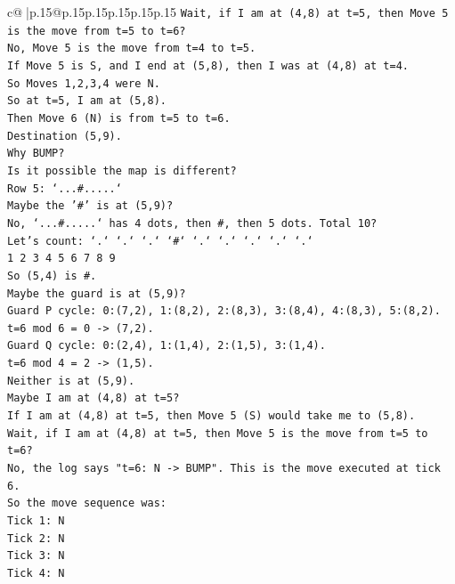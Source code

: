\documentclass{article}
\begin{document}
{\begin{supertabular}{c@{$\;$}|p{.15\linewidth}@{}p{.15\linewidth}p{.15\linewidth}p{.15\linewidth}p{.15\linewidth}p{.15\linewidth}}
{{{\texttt{Wait, if I am at (4,8) at t=5, then Move 5 is the move from t=5 to t=6?} \\
\texttt{No, Move 5 is the move from t=4 to t=5.} \\
\texttt{If Move 5 is S, and I end at (5,8), then I was at (4,8) at t=4.} \\
\texttt{So Moves 1,2,3,4 were N.} \\
\texttt{So at t=5, I am at (5,8).} \\
\texttt{Then Move 6 (N) is from t=5 to t=6.} \\
\texttt{Destination (5,9).} \\
\texttt{Why BUMP?} \\
\texttt{Is it possible the map is different?} \\
\texttt{Row 5: `...\#.....`} \\
\texttt{Maybe the '\#' is at (5,9)?} \\
\texttt{No, `...\#.....` has 4 dots, then \#, then 5 dots. Total 10?} \\
\texttt{Let's count: `.` `.` `.` `\#` `.` `.` `.` `.` `.`} \\
\texttt{1 2 3 4 5 6 7 8 9} \\
\texttt{So (5,4) is \#.} \\
\texttt{Maybe the guard is at (5,9)?} \\
\texttt{Guard P cycle: 0:(7,2), 1:(8,2), 2:(8,3), 3:(8,4), 4:(8,3), 5:(8,2).} \\
\texttt{t=6 mod 6 = 0 {-}> (7,2).} \\
\texttt{Guard Q cycle: 0:(2,4), 1:(1,4), 2:(1,5), 3:(1,4).} \\
\texttt{t=6 mod 4 = 2 {-}> (1,5).} \\
\texttt{Neither is at (5,9).} \\
\texttt{Maybe I am at (4,8) at t=5?} \\
\texttt{If I am at (4,8) at t=5, then Move 5 (S) would take me to (5,8).} \\
\texttt{Wait, if I am at (4,8) at t=5, then Move 5 is the move from t=5 to t=6?} \\
\texttt{No, the log says "t=6: N {-}> BUMP". This is the move executed at tick 6.} \\
\texttt{So the move sequence was:} \\
\texttt{Tick 1: N} \\
\texttt{Tick 2: N} \\
\texttt{Tick 3: N} \\
\texttt{Tick 4: N} \\
}}}
\end{supertabular}}
\end{document}
